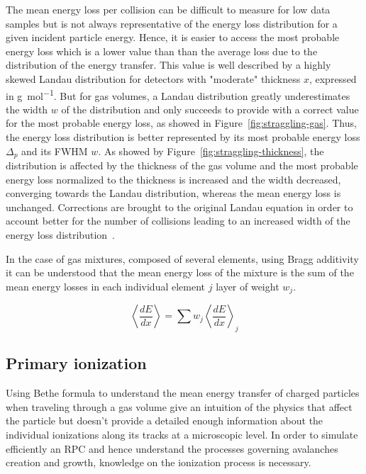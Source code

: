 	The mean energy loss per collision can be difficult to measure for low data samples but is not always representative of the energy loss distribution for a given incident particle energy. Hence, it is easier to access the most probable energy loss which is a lower value than than the average loss due to the distribution of the energy transfer. This value is well described by a highly skewed Landau distribution for detectors with "moderate" thickness $x$, expressed in \si{g.mol^{-1}}. But for gas volumes, a Landau distribution greatly underestimates the width $w$ of the distribution and only succeeds to provide with a correct value for the most probable energy loss, as showed in Figure~\ref{fig:straggling-gas}. Thus, the energy loss distribution is better represented by its most probable energy loss $\Delta_p$ and its \acf{FWHM} $w$. As showed by Figure~\ref{fig:straggling-thickness}, the distribution is affected by the thickness of the gas volume and the most probable energy loss normalized to the thickness is increased and the width decreased, converging towards the Landau distribution, whereas the mean energy loss is unchanged. Corrections are brought to the original Landau equation in order to account better for the number of collisions leading to an increased width of the energy loss distribution~\cite{BISCHEL2006}.
	
	In the case of gas mixtures, composed of several elements, using Bragg additivity it can be understood that the mean energy loss of the mixture is the sum of the mean energy losses in each individual element $j$ layer of weight $w_j$.
	
	\begin{equation}
	\label{eq:mixtureloss}
	\left\langle \frac{dE}{dx} \right\rangle = \sum w_j \left\langle \frac{dE}{dx} \right\rangle_j
	\end{equation}
		
	\subsection{Primary ionization}
	\label{chapt4:ssec:ionization}
	
	Using Bethe formula to understand the mean energy transfer of charged particles when traveling through a gas volume give an intuition of the physics that affect the particle but doesn't provide a detailed enough information about the individual ionizations along its tracks at a microscopic level. In order to simulate efficiently an RPC and hence understand the processes governing avalanches creation and growth, knowledge on the ionization process is necessary.
	
